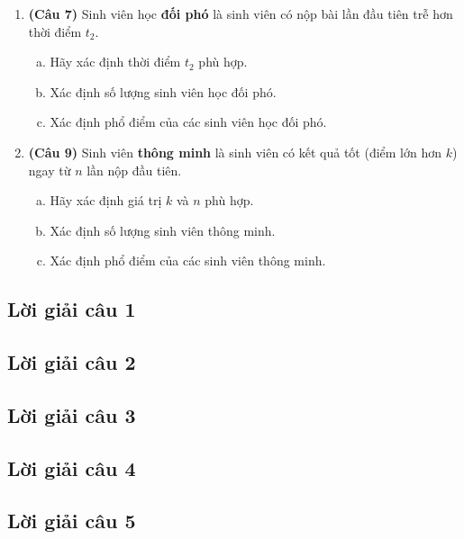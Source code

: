 \documentclass[12pt,a4paper]{article}  %
\begin{document}
\begin{enumerate}
    
\item {\textbf{(Câu 7)} Sinh viên học \textbf{đối phó} là sinh viên có nộp bài lần đầu tiên trễ hơn thời điểm $t_2$.} 
\begin{enumerate}[a)]
    \item {Hãy xác định thời điểm $t_2$ phù hợp.}
    \item {Xác định số lượng sinh viên học đối phó.}
    \item {Xác định phổ điểm của các sinh viên học đối phó.}
\end{enumerate}
    

    
\item {\textbf{(Câu 9)} Sinh viên \textbf{thông minh} là sinh viên  có kết quả tốt (điểm lớn hơn $k$) ngay từ $n$ lần nộp đầu tiên.}
\begin{enumerate}[a)]
    \item {Hãy xác định giá trị $k$ và $n$ phù hợp.} 
    \item {Xác định số lượng sinh viên thông minh.}
    \item {Xác định phổ điểm của các sinh viên thông minh.}
\end{enumerate}    
    
\end{enumerate}
\subsection{Lời giải câu 1}
\subsection{Lời giải câu 2}
\subsection{Lời giải câu 3}
\subsection{Lời giải câu 4}
\subsection{Lời giải câu 5}
\end{document}
